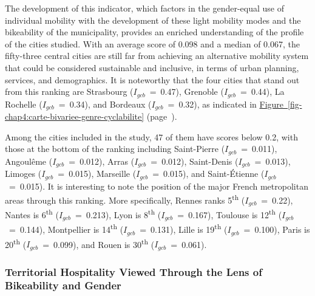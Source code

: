 \begin{refsegment}
The development of this indicator, which factors in the gender-equal use of individual mobility with the development of these light mobility modes and the bikeability of the municipality, provides an enriched understanding of the profile of the cities studied. With an average score of 0.098 and a median of 0.067, the fifty-three central cities are still far from achieving an alternative mobility system that could be considered sustainable and inclusive, in terms of urban planning, services, and demographics. It is noteworthy that the four cities that stand out from this ranking are Strasbourg (\(I_{gcb}\)~=~0.47), Grenoble (\(I_{gcb}\)~=~0.44), La Rochelle (\(I_{gcb}\)~=~0.34), and Bordeaux (\(I_{gcb}\)~=~0.32), as indicated in \hyperref[fig-chap4:carte-bivariee-genre-cyclabilite]{Figure~\ref{fig-chap4:carte-bivariee-genre-cyclabilite}} (page~\pageref{fig-chap4:carte-bivariee-genre-cyclabilite}).%

Among the cities included in the study, 47 of them have scores below 0.2, with those at the bottom of the ranking including Saint-Pierre (\(I_{gcb}\)~=~0.011), Angoulême (\(I_{gcb}\)~=~0.012), Arras (\(I_{gcb}\)~=~0.012), Saint-Denis (\(I_{gcb}\)~=~0.013), Limoges (\(I_{gcb}\)~=~0.015), Marseille (\(I_{gcb}\)~=~0.015), and Saint-Étienne (\(I_{gcb}\)~=~0.015). It is interesting to note the position of the major French metropolitan areas through this ranking. More specifically, Rennes ranks 5\textsuperscript{th} (\(I_{gcb}\)~=~0.22), Nantes is 6\textsuperscript{th} (\(I_{gcb}\)~=~0.213), Lyon is 8\textsuperscript{th} (\(I_{gcb}\)~=~0.167), Toulouse is 12\textsuperscript{th} (\(I_{gcb}\)~=~0.144), Montpellier is 14\textsuperscript{th} (\(I_{gcb}\)~=~0.131), Lille is 19\textsuperscript{th} (\(I_{gcb}\)~=~0.100), Paris is 20\textsuperscript{th} (\(I_{gcb}\)~=~0.099), and Rouen is 30\textsuperscript{th} (\(I_{gcb}\)~=~0.061).%

\subsubsection*{Territorial Hospitality Viewed Through the Lens of Bikeability and Gender
    \label{chap4:discussion-cyclabilite-genre}
    }


\end{refsegment}
